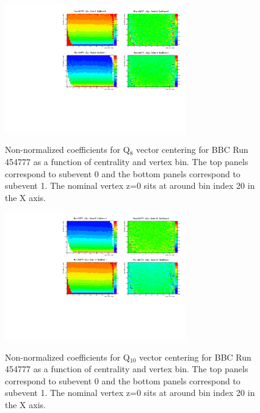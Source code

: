 \documentclass{article}
\begin{document}
\begin{figure}
\centering
\includegraphics[width=0.7\textwidth]{fig_eventplane/QC_454777_ORD6.pdf}
\label{fig.bbc.qc6}
\caption{Non-normalized coefficients for Q$_8$ vector centering for BBC Run 454777 as a function of centrality and vertex bin. The top panels correspond to subevent 0 and the bottom panels correspond to subevent 1. The nominal vertex z=0 sits at around bin index 20 in the X axis.}
\end{figure}
\begin{figure}
\centering
\includegraphics[width=0.7\textwidth]{fig_eventplane/QC_454777_ORD7.pdf}
\label{fig.bbc.qc7}
\caption{Non-normalized coefficients for Q$_{10}$ vector centering for BBC Run 454777 as a function of centrality and vertex bin. The top panels correspond to subevent 0 and the bottom panels correspond to subevent 1. The nominal vertex z=0 sits at around bin index 20 in the X axis.}
\end{figure}
\end{document}
